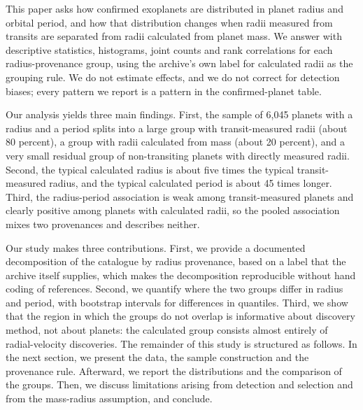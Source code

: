 \documentclass[11pt]{article}
\begin{document}
This paper asks how confirmed exoplanets are distributed in planet radius and orbital period, and how that distribution changes when radii measured from transits are separated from radii calculated from planet mass. We answer with descriptive statistics, histograms, joint counts and rank correlations for each radius-provenance group, using the archive's own label for calculated radii as the grouping rule. We do not estimate effects, and we do not correct for detection biases; every pattern we report is a pattern in the confirmed-planet table.

Our analysis yields three main findings. First, the sample of 6,045 planets with a radius and a period splits into a large group with transit-measured radii (about 80 percent), a group with radii calculated from mass (about 20 percent), and a very small residual group of non-transiting planets with directly measured radii. Second, the typical calculated radius is about five times the typical transit-measured radius, and the typical calculated period is about 45 times longer. Third, the radius-period association is weak among transit-measured planets and clearly positive among planets with calculated radii, so the pooled association mixes two provenances and describes neither.

Our study makes three contributions. First, we provide a documented decomposition of the catalogue by radius provenance, based on a label that the archive itself supplies, which makes the decomposition reproducible without hand coding of references. Second, we quantify where the two groups differ in radius and period, with bootstrap intervals for differences in quantiles. Third, we show that the region in which the groups do not overlap is informative about discovery method, not about planets: the calculated group consists almost entirely of radial-velocity discoveries. The remainder of this study is structured as follows. In the next section, we present the data, the sample construction and the provenance rule. Afterward, we report the distributions and the comparison of the groups. Then, we discuss limitations arising from detection and selection and from the mass-radius assumption, and conclude.
\end{document}

